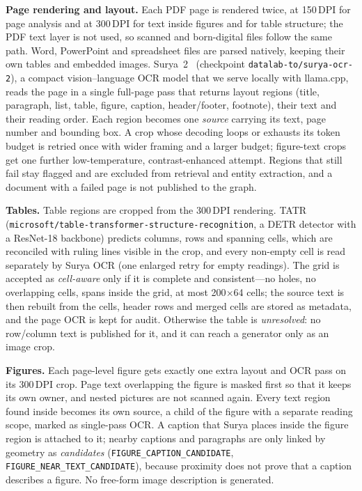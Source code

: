 \documentclass[runningheads]{llncs}
\begin{document}
\textbf{Page rendering and layout.} Each PDF page is rendered twice, at 150\,DPI for page analysis and at 300\,DPI for text inside figures and for table structure; the PDF text layer is not used, so scanned and born-digital files follow the same path. Word, PowerPoint and spreadsheet files are parsed natively, keeping their own tables and embedded images. Surya~2~\cite{paruchuri2026surya2} (checkpoint \texttt{datalab-to/surya-ocr-2}), a compact vision--language OCR model that we serve locally with llama.cpp, reads the page in a single full-page pass that returns layout regions (title, paragraph, list, table, figure, caption, header/footer, footnote), their text and their reading order. Each region becomes one \emph{source} carrying its text, page number and bounding box. A crop whose decoding loops or exhausts its token budget is retried once with wider framing and a larger budget; figure-text crops get one further low-temperature, contrast-enhanced attempt. Regions that still fail stay flagged and are excluded from retrieval and entity extraction, and a document with a failed page is not published to the graph.

\textbf{Tables.} Table regions are cropped from the 300\,DPI rendering. TATR~\cite{smock2022pubtables} (\texttt{microsoft/table-transformer-structure-recognition}, a DETR detector with a ResNet-18 backbone) predicts columns, rows and spanning cells, which are reconciled with ruling lines visible in the crop, and every non-empty cell is read separately by Surya OCR (one enlarged retry for empty readings). The grid is accepted as \emph{cell-aware} only if it is complete and consistent---no holes, no overlapping cells, spans inside the grid, at most 200$\times$64 cells; the source text is then rebuilt from the cells, header rows and merged cells are stored as metadata, and the page OCR is kept for audit. Otherwise the table is \emph{unresolved}: no row/column text is published for it, and it can reach a generator only as an image crop.

\textbf{Figures.} Each page-level figure gets exactly one extra layout and OCR pass on its 300\,DPI crop. Page text overlapping the figure is masked first so that it keeps its own owner, and nested pictures are not scanned again. Every text region found inside becomes its own source, a child of the figure with a separate reading scope, marked as single-pass OCR. A caption that Surya places inside the figure region is attached to it; nearby captions and paragraphs are only linked by geometry as \emph{candidates} (\texttt{FIGURE\_CAPTION\_CANDIDATE}, \texttt{FIGURE\_NEAR\_TEXT\_CANDIDATE}), because proximity does not prove that a caption describes a figure. No free-form image description is generated.
\end{document}
